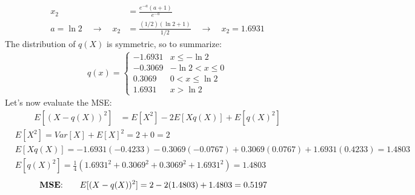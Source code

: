 \documentclass[12pt, letterpaper]{scrartcl}
\begin{document}
\begin{enumerate}[((a))]
\begin{align*}
        x_2&=\frac{e^{-a}(a+1)}{e^{-a}}\\
        a=\ln2 \quad \longrightarrow \quad x_2&=\frac{(1/2)(\ln2+1)}{1/2}\quad \longrightarrow \quad x_2=1.6931
    \end{align*}
    The distribution of $q(X)$ is symmetric, so to summarize:
    \begin{align*}
        q(x)=
        \begin{cases} 
            -1.6931 & x\leq -\ln2 \\
            -0.3069 & -\ln2 < x \leq 0\\
            0.3069 & 0 < x \leq \ln2\\
            1.6931 &  x > \ln2
        \end{cases}
    \end{align*}
    Let's now evaluate the MSE:
    \begin{align*}
        E[(X-q(X))^2]&=E[X^2]-2E[Xq(X)]+E[q(X)^2]
    \end{align*}
    \begin{align*}
        &E[X^2]=Var[X]+E[X]^2=2+0=2\\
        &E[Xq(X)]=-1.6931(-0.4233)-0.3069(-0.0767)+0.3069(0.0767)+1.6931(0.4233)=1.4803\\
        &E[q(X)^2]=\frac{1}{4}(1.6931^2+0.3069^2+0.3069^2+1.6931^2)=1.4803
    \end{align*}
    \begin{align*}
        \text{\textbf{MSE}:}\qquad E[(X-q(X))^2]&=2-2(1.4803)+1.4803=0.5197
    \end{align*}
\end{enumerate}
\end{document}
